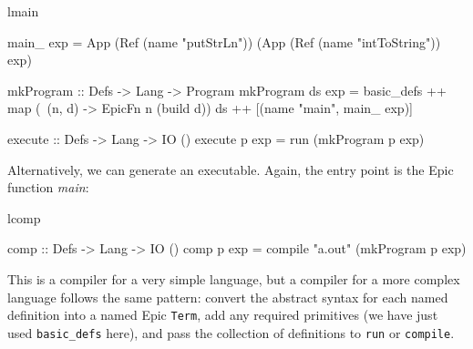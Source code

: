 \begin{SaveVerbatim}{lmain}

main_ exp = App (Ref (name "putStrLn"))
                (App (Ref (name "intToString")) exp)

mkProgram :: Defs -> Lang -> Program
mkProgram ds exp = basic_defs ++ 
                   map (\ (n, d) -> EpicFn n (build d)) ds ++
                   [(name "main", main_ exp)]

execute :: Defs -> Lang -> IO ()
execute p exp = run (mkProgram p exp)

\end{SaveVerbatim}

\noindent
Alternatively, we can generate an executable. Again, the entry point
is the Epic function \textit{main}:

\begin{SaveVerbatim}{lcomp}

comp :: Defs -> Lang -> IO ()
comp p exp = compile "a.out" (mkProgram p exp)

\end{SaveVerbatim}

\noindent
This is a compiler for a very simple language, but a compiler for a
more complex language follows the same pattern: convert the abstract
syntax for each named definition into a named Epic \texttt{Term}, add
any required primitives (we have just used \texttt{basic\_defs} here),
and pass the collection of definitions to \texttt{run} or
\texttt{compile}. 


